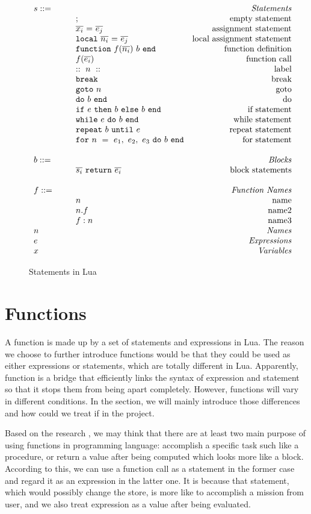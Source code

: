 \begin{figure}
\caption{Statements in Lua}
\label{fig:LuaStat}
\[
\begin{array}{llr}
  \mydefhead{s ::=\qquad\qquad\qquad\qquad}{Statements}
  \mydefcase{;}{empty statement}
  \mydefcase{\assign x e}{assignment statement}
  \mydefcase{\local n e}{local assignment statement}
  \mydefcase{\function f n b}{function definition}
  \mydefcase{f(\overline{e_i})}{function call}
  \mydefcase{::~n~::}{label}
  \mydefcase{\tt break}{break}
  \mydefcase{{\tt goto} ~n}{goto}
  \mydefcase{\doe b}{do}
  \mydefcase{\ife e b b}{if statement}
  \mydefcase{\whilee e b}{while statement}
  \mydefcase{\repeate e b}{repeat statement}
  \mydefcase{\for n e b}{for statement}
  \\
  \mydefhead{b ::=\qquad\qquad\qquad\qquad}{Blocks}
  \mydefcase{\overline{s_i}~{\tt return}~\overline{e_i}}{block statements}
  \\
  \mydefhead{f ::=\qquad\qquad\qquad\qquad}{Function Names}
  \mydefcase{n}{name}
  \mydefcase{n.f}{name2}
  \mydefcase{f:n}{name3}
  \mydefhead{n \qquad\qquad\qquad\qquad}{Names}
  \mydefhead{e \qquad\qquad\qquad\qquad}{Expressions}
  \mydefhead{x \qquad\qquad\qquad\qquad}{Variables}
\end{array}
\]
\end{figure}

\section{Functions}
A function is made up by a set of statements and expressions in Lua. The reason we choose to further introduce functions would be that they could be used as either expressions or statements, which are totally different in Lua. Apparently, function is a bridge that efficiently links the syntax of expression and statement so that it stops them from being apart completely. However, functions will vary in different conditions. In the section, we will mainly introduce those differences and how could we treat if in the project.

Based on the research \cite{PIL}, we may think that there are at least two main purpose of using functions in programming language: accomplish a specific task such like a procedure, or return a value after being computed which looks more like a block. According to this, we can use a function call as a statement in the former case and regard it as an expression in the latter one. It is because that statement, which would possibly change the store, is more like to accomplish a mission from user, and we also treat expression as a value after being evaluated.

